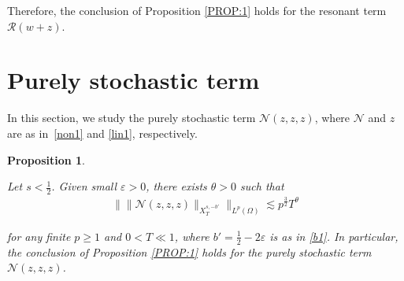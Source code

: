\documentclass[%
11pt,  reqno]{amsart}
\newtheorem{proposition}[theorem]{Proposition}
\newtheorem{remark}[theorem]{Remark}
\newcommand{\1}{\hspace{0.2mm}\text{I}\hspace{0.2mm}}
\newcommand{\noi}{\noindent}
\newcommand{\eps}{\varepsilon}
\newcommand{\wt}{\widetilde}
\newcommand{\ta}{\theta}
\renewcommand{\O}{\Omega}
\newcommand{\les}{\lesssim}
\newcommand{\NN}{\mathcal{N}}
\newcommand{\RR}{\mathcal{R}}
\numberwithin{equation}{section}
\numberwithin{theorem}{section}
\begin{document}
Therefore, the conclusion of Proposition \ref{PROP:1}
holds
for the resonant term $\RR(w+z)$.


%
%






\section{Purely stochastic term}
\label{SEC:PS1}


In this section, we study the purely stochastic term $\NN(z, z, z)$,
where $\NN$ and $z$ are
as in~\eqref{non1}
and \eqref{lin1}, respectively.


\begin{proposition}
\label{PROP:PS1}

Let $s < \frac 12$.
Given small $\eps > 0$, 
 there exists $\ta > 0$
such that 
\begin{align}
\label{PS1}
\Big\|
\| \NN(z, z, z)\|_{X^{s,-b'}_T}\Big\|_{L^p(\O)}
\les p^\frac 32 T^\ta
\end{align}

\noi
for any finite $p \ge 1$ and $0 < T\ll 1$, where 
 $b' = \frac 12 - 2\eps$
is  as in \eqref{b1}.
In particular, 
 the conclusion of Proposition \ref{PROP:1}
holds
for the purely stochastic term $\NN(z, z, z)$.

\end{proposition}
\end{document}
